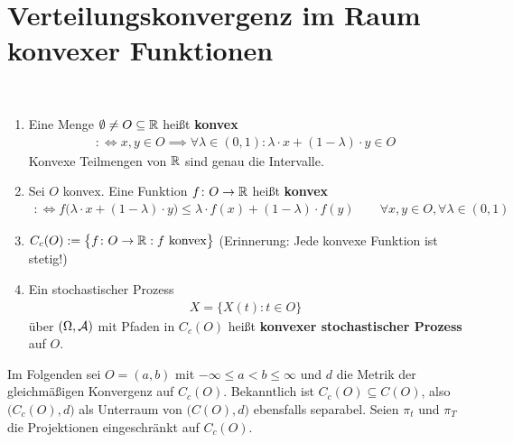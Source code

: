 
\section{Verteilungskonvergenz im Raum konvexer Funktionen} %

\begin{definition}\label{def9.1}\
	\begin{enumerate}[label=(\arabic*)]
		\item Eine Menge $\emptyset\neq O\subseteq\mathbb{R}$ heißt \textbf{konvex}
		\begin{align*}
			:\Longleftrightarrow x,y\in O\implies\forall\lambda\in(0,1):\lambda\cdot x+(1-\lambda)\cdot y\in O
		\end{align*}
		Konvexe Teilmengen von $\mathbb{R}$ sind genau die Intervalle.
		\item Sei $O$ konvex. Eine Funktion $f\colon O\to\mathbb{R}$ heißt \textbf{konvex}
		\begin{align*}
			:\Longleftrightarrow 
			f\big(\lambda\cdot x+(1-\lambda)\cdot y\big)\leq\lambda\cdot f(x)+(1-\lambda)\cdot f(y)\qquad\forall x,y\in O,\forall\lambda\in(0,1)
		\end{align*}
		\item $\begin{aligned}
			C_c(O):=\big\lbrace f\colon O\to\mathbb{R}:f\text{ konvex}\big\rbrace
		\end{aligned}$ (Erinnerung: Jede konvexe Funktion ist stetig!)
		\item Ein stochastischer Prozess
		\begin{align*}
			X=\big\lbrace X(t):t\in O\big\rbrace
		\end{align*}				
		über $(\Omega,\mathcal{A})$ mit Pfaden in $C_c(O)$ heißt \textbf{konvexer stochastischer Prozess} auf $O$.
	\end{enumerate}
\end{definition}

Im Folgenden sei $O=(a,b)$ mit $-\infty\leq a<b\leq\infty$ und $d$ die Metrik der gleichmäßigen Konvergenz auf $C_c(O)$.
Bekanntlich ist $C_c(O)\subseteq C(O)$, also $\big(C_c(O),d\big)$ als Unterraum von $\big(C(O),d\big)$ ebensfalls separabel.
Seien $\pi_t$ und $\pi_T$ die Projektionen eingeschränkt auf $C_c(O)$.

